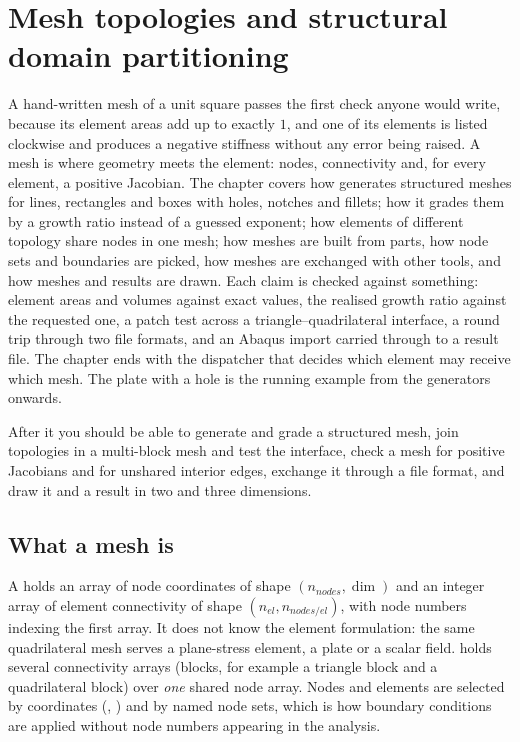 \chapter{Mesh topologies and structural domain partitioning}\label{ch:mesh}

\begin{tcolorbox}[colback=hpale,colframe=hnavy!60,coltitle=white,colbacktitle=hnavy!85,title={In this chapter}]
A hand-written mesh of a unit square passes the first check anyone would write, because its element areas add up to exactly $1$, and one of its elements is listed clockwise and produces a negative stiffness without any error being raised. A mesh is where geometry meets the element: nodes, connectivity and, for every element, a positive Jacobian. The chapter covers how \fea{} generates structured meshes for lines, rectangles and boxes with holes, notches and fillets; how it grades them by a growth ratio instead of a guessed exponent; how elements of different topology share nodes in one mesh; how meshes are built from parts, how node sets and boundaries are picked, how meshes are exchanged with other tools, and how meshes and results are drawn. Each claim is checked against something: element areas and volumes against exact values, the realised growth ratio against the requested one, a patch test across a triangle--quadrilateral interface, a round trip through two file formats, and an Abaqus import carried through to a result file. The chapter ends with the dispatcher that decides which element may receive which mesh. The plate with a hole is the running example from the generators onwards.\par\smallskip
After it you should be able to generate and grade a structured mesh, join topologies in a multi-block mesh and test the interface, check a mesh for positive Jacobians and for unshared interior edges, exchange it through a file format, and draw it and a result in two and three dimensions.
\end{tcolorbox}

\section{What a mesh is}\label{sec:me-what}

A  holds an array of node coordinates of shape $(n_{nodes},\dim)$ and an integer array of element connectivity of shape $(n_{el},n_{nodes/el})$, with node numbers indexing the first array. It does not know the element formulation: the same quadrilateral mesh serves a plane-stress element, a plate or a scalar field.  holds several connectivity arrays (blocks, for example a triangle block and a quadrilateral block) over \emph{one} shared node array. Nodes and elements are selected by coordinates (, ) and by named node sets, which is how boundary conditions are applied without node numbers appearing in the analysis.

